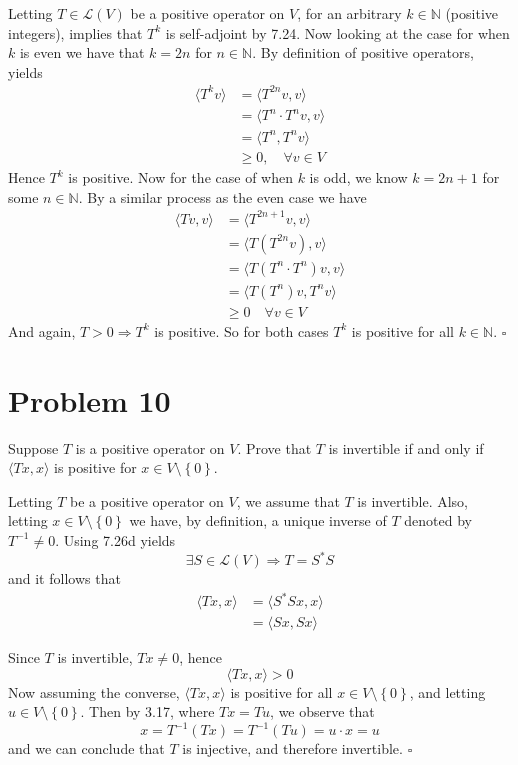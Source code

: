 \documentclass[12pt]{article}
\newcommand{\N}{\mathbb{N}}
\newcommand{\set}[1]{\left\{ #1\right\}}
\newenvironment{proof}{\noindent{\bf Proof.}}{\hfill $\square$\medskip}
\begin{document}
\begin{proof}
Letting $T\in\mathcal{L}(V)$ be a positive operator on $V$, for an arbitrary $k\in\N$ (positive integers), implies that $T^{k}$ is self-adjoint by 7.24. Now looking at the case for when $k$ is even we have that $k=2n$ for $n\in\N$. By definition of positive operators, yields
\begin{equation}
\begin{split}
\langle T^{k}v\rangle&=\langle T^{2n}v,v\rangle\\
&=\langle T^{n}\cdot T^{n}v,v\rangle\\
&=\langle T^{n},T^{n}v\rangle\\
&\geq 0,\quad\forall v\in V
\end{split}
\end{equation}
Hence $T^{k}$ is positive.
Now for the case of when $k$ is odd, we know $k=2n+1$ for some $n\in\N$. By a similar process as the even case we have
\begin{equation}
\begin{split}
\langle Tv,v\rangle&=\langle T^{2n+1}v,v\rangle\\
&=\langle T(T^{2n}v),v\rangle\\
&=\langle T(T^{n}\cdot T^{n})v,v\rangle\\
&=\langle T(T^{n})v, T^{n}v\rangle\\
&\geq 0\quad\forall v\in V
\end{split}
\end{equation}
And again, $T>0\Rightarrow T^{k}$ is positive.
So for both cases $T^{k}$ is positive for all $k\in\N$.
\end{proof}


\newpage
\section{Problem 10}
Suppose $T$ is a positive operator on $V$. Prove that $T$ is invertible if and only if $\langle Tx,x\rangle$ is positive for $x\in V\setminus \set{0}$.

\begin{proof}
Letting $T$ be a positive operator on $V$, we assume that $T$ is invertible. Also, letting $x\in V\setminus \set{0}$ we have, by definition, a unique inverse of $T$ denoted by $T^{-1}\neq 0$. Using 7.26d yields
$$\exists S\in\mathcal{L}(V)\Rightarrow T=S^{*}S$$
and it follows that
\begin{equation}
\begin{split}
\langle Tx,x\rangle&=\langle S^{*}Sx,x\rangle\\
&=\langle Sx,Sx\rangle
\end{split}
\end{equation}

Since $T$ is invertible, $Tx\neq 0$, hence 
$$\langle Tx,x\rangle>0$$
Now assuming the converse, $\langle Tx,x\rangle$ is positive for all $x\in V\setminus\set{0}$, and letting $u\in V\setminus\set{0}$. Then by 3.17, where $Tx=Tu$, we observe that
$$x=T^{-1}(Tx)=T^{-1}(Tu)=u\cdot x=u$$
and we can conclude that $T$ is injective, and therefore invertible.
\end{proof}
\end{document}
